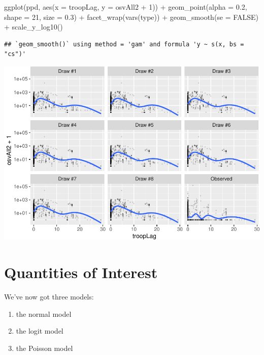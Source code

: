 \documentclass[
]{book}
\newenvironment{Shaded}{\begin{snugshade}}{\end{snugshade}}
\newcommand{\AttributeTok}[1]{\textcolor[rgb]{0.77,0.63,0.00}{#1}}
\newcommand{\ConstantTok}[1]{\textcolor[rgb]{0.00,0.00,0.00}{#1}}
\newcommand{\DecValTok}[1]{\textcolor[rgb]{0.00,0.00,0.81}{#1}}
\newcommand{\FloatTok}[1]{\textcolor[rgb]{0.00,0.00,0.81}{#1}}
\newcommand{\FunctionTok}[1]{\textcolor[rgb]{0.00,0.00,0.00}{#1}}
\newcommand{\NormalTok}[1]{#1}
\newcommand{\SpecialCharTok}[1]{\textcolor[rgb]{0.00,0.00,0.00}{#1}}
\providecommand{\tightlist}{%
  \setlength{\itemsep}{0pt}\setlength{\parskip}{0pt}}
\begin{document}
\begin{Shaded}
\begin{Highlighting}[]
\FunctionTok{ggplot}\NormalTok{(ppd, }\FunctionTok{aes}\NormalTok{(}\AttributeTok{x =}\NormalTok{ troopLag, }\AttributeTok{y =}\NormalTok{ osvAll2 }\SpecialCharTok{+} \DecValTok{1}\NormalTok{)) }\SpecialCharTok{+} 
  \FunctionTok{geom\_point}\NormalTok{(}\AttributeTok{alpha =} \FloatTok{0.2}\NormalTok{, }\AttributeTok{shape =} \DecValTok{21}\NormalTok{, }\AttributeTok{size =} \FloatTok{0.3}\NormalTok{) }\SpecialCharTok{+} 
  \FunctionTok{facet\_wrap}\NormalTok{(}\FunctionTok{vars}\NormalTok{(type)) }\SpecialCharTok{+} 
  \FunctionTok{geom\_smooth}\NormalTok{(}\AttributeTok{se =} \ConstantTok{FALSE}\NormalTok{) }\SpecialCharTok{+} 
  \FunctionTok{scale\_y\_log10}\NormalTok{()}
\end{Highlighting}
\end{Shaded}

\begin{verbatim}
## `geom_smooth()` using method = 'gam' and formula 'y ~ s(x, bs = "cs")'
\end{verbatim}

\includegraphics{03-04-predictive-distributions_files/figure-latex/unnamed-chunk-8-1.pdf}

\hypertarget{quantities-of-interest}{%
\section{Quantities of Interest}\label{quantities-of-interest}}

We've now got three models:

\begin{enumerate}
\def\labelenumi{\arabic{enumi}.}
\tightlist
\item
  the normal model
\item
  the logit model
\item
  the Poisson model
\end{enumerate}
\end{document}

